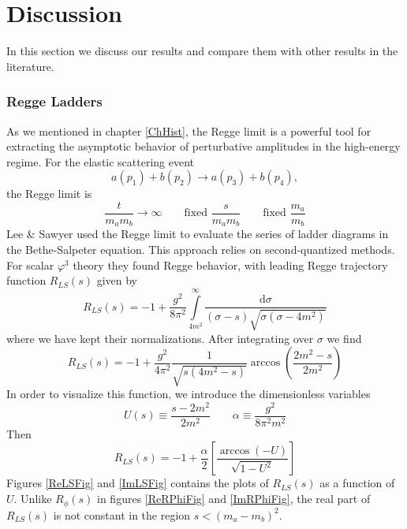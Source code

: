 \section{Discussion}
In this section we discuss our results and compare them with other results in the literature.
\subsubsection{Regge Ladders}
As we mentioned in chapter \ref{ChHist}, the Regge limit is a powerful tool for extracting the asymptotic behavior of perturbative amplitudes in the high-energy regime. For the elastic scattering event
\begin{equation}
	a(p_{1}) + b(p_{2}) \longrightarrow a(p_{3}) + b(p_{4}),
\end{equation}
the Regge limit is
\begin{equation}
	\frac{t}{m_{a} m_{b}} \rightarrow \infty \qquad \text{fixed } \frac{s}{m_{a} m_{b}} \qquad \text{fixed } \frac{m_{a}}{m_{b}} \label{RLimit}
\end{equation}
Lee \& Sawyer \cite{LeeSawyer} used the Regge limit to evaluate the series of ladder diagrams in the Bethe-Salpeter equation. This approach relies on second-quantized methods. For scalar $\varphi^{3}$ theory they found Regge behavior, with leading Regge trajectory function $R_{LS}(s)$ given by
\begin{equation}
	R_{LS}(s) = -1 + \frac{g^{2}}{8 \pi^{2}} \int\limits_{4m^{2}}^{\infty} \frac{\mathrm{d}\sigma}{(\sigma - s) \sqrt{\sigma (\sigma - 4 m^{2}) } } \label{LeeSaw1m}
\end{equation}
where we have kept their normalizations. After integrating over $\sigma$ we find
\begin{equation}
	R_{LS}(s) = -1 + \frac{g^{2}}{4 \pi^{2}} \frac{1}{\sqrt{s (4 m^{2} - s)}} \operatorname{arccos}{\left( \frac{2m^{2} - s}{2m^{2}} \right)}
\end{equation}
In order to visualize this function, we introduce the dimensionless variables
\begin{equation}
	U(s) \equiv \frac{s - 2m^{2}}{2m^{2}} \qquad \alpha \equiv \frac{g^{2}}{8\pi^{2} m^{2}}
\end{equation}
Then
\begin{equation}
	R_{LS}(s) = -1 + \frac{\alpha}{2} \left[ \frac{\arccos{\left(-U \right)}}{\sqrt{1 - U^{2}}} \right]
\end{equation}
Figures \ref{ReLSFig} and \ref{ImLSFig} contains the plots of $R_{LS}(s)$ as a function of $U$. Unlike $R_{\phi}(s)$ in figures \ref{ReRPhiFig} and \ref{ImRPhiFig}, the real part of $R_{LS}(s)$ is not constant in the region $s < (m_{a} - m_{b})^{2}$.


